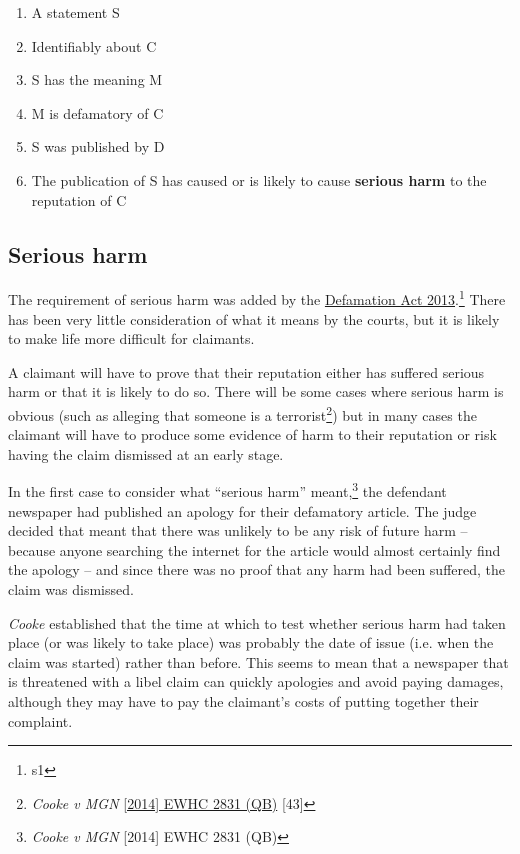 \documentclass[]{article}
\begin{document}
\begin{enumerate}
\item  A statement S
\item  Identifiably about C
\item  S has the meaning M
\item  M is defamatory of C
\item  S was published by D
\item The publication of S has caused or is likely to cause {\bf serious harm} to the reputation of C
\end{enumerate}

\subsection{Serious harm}
The requirement of serious harm was added by the \href{http://www.legislation.gov.uk/ukpga/2013/26/contents/enacted}{Defamation Act 2013}.\footnote{s1} There has been very little consideration of what it means by the courts, but it is likely to make life more difficult for claimants.

A claimant will have to prove that their reputation either has suffered serious harm or that it is likely to do so. There will be some cases where serious harm is obvious (such as alleging that someone is a terrorist\footnote{{\protect\it Cooke v MGN} \href{http://www.bailii.org/ew/cases/EWHC/QB/2014/2831.html}{[2014] EWHC 2831 (QB)} [43]}) but in many cases the claimant will have to produce some evidence of harm to their reputation or risk having the claim dismissed at an early stage.

In the first case to consider what ``serious harm'' meant,\footnote{{\protect\it Cooke v MGN} {[2014] EWHC 2831 (QB)}} the defendant newspaper had published an apology for their defamatory article. The judge decided that meant that there was unlikely to be any risk of future harm -- because anyone searching the internet for the article would almost certainly find the apology -- and since there was no proof that any harm had been suffered, the claim was dismissed.

{\it Cooke} established that the time at which to test whether serious harm had taken place (or was likely to take place) was probably the date of issue (i.e. when the claim was started) rather than before. This seems to mean that a newspaper that is threatened with a libel claim can quickly apologies and avoid paying damages, although they may have to pay the claimant's costs of putting together their complaint.
\end{document}
